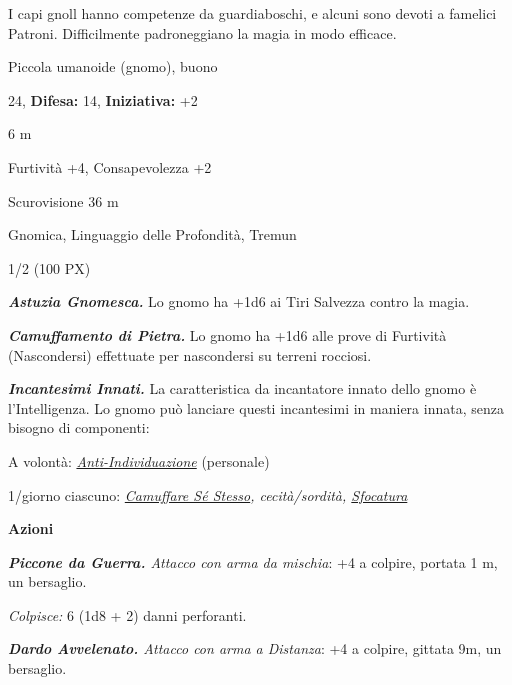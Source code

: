 \begin{multicols}{2}
{I capi gnoll hanno competenze da guardiaboschi, e alcuni sono devoti a famelici Patroni. Difficilmente padroneggiano la magia in modo efficace.

\noindent
\begin{description}[noitemsep, topsep=0pt, parsep=0pt, partopsep=0pt, leftmargin=0cm, labelwidth=2.2cm]
	\item[\textbf{Taglia/Tipo:}] Piccola umanoide (gnomo), buono
	\item[\textbf{Caratt.:}] 
	\item[\textbf{Punti Ferita:}] 24,  \textbf{Difesa:} 14,  \textbf{Iniziativa:} +2
	\item[\textbf{Movimento:}] 6 m
	\item[\textbf{Tiri Salvez.:}] 
	\item[\textbf{Comp.:}] Furtività +4, Consapevolezza +2
	\item[\textbf{Sensi:}] Scurovisione 36 m
	\item[\textbf{Linguaggi:}] Gnomica, Linguaggio delle Profondità, Tremun
	\item[\textbf{Sfida:}] 1/2 (100 PX)\smallskip
\end{description}

\emph{\textbf{Astuzia Gnomesca.}} Lo gnomo ha +1d6 ai Tiri Salvezza contro la magia.

\emph{\textbf{Camuffamento di Pietra.}} Lo gnomo ha +1d6 alle prove di Furtività (Nascondersi) effettuate per nascondersi su terreni rocciosi.

\emph{\textbf{Incantesimi Innati.}} La caratteristica da incantatore innato dello gnomo è l'Intelligenza. Lo gnomo può lanciare questi incantesimi in maniera innata, senza bisogno di componenti:

A volontà: \emph{\hyperlink{Anti-Individuazione}{Anti-Individuazione}} (personale)

1/giorno ciascuno: \emph{\hyperlink{Camuffare Sé Stesso}{Camuffare Sé Stesso}, cecità/sordità, \hyperlink{Sfocatura}{Sfocatura}}

\textbf{Azioni}

\emph{\textbf{Piccone da Guerra.} Attacco con arma da mischia}: +4 a colpire, portata 1 m, un bersaglio.

\emph{Colpisce:} 6 (1d8 + 2) danni perforanti.

\emph{\textbf{Dardo Avvelenato.} Attacco con arma a Distanza}: +4 a colpire, gittata 9m, un bersaglio.

}
\end{multicols}
